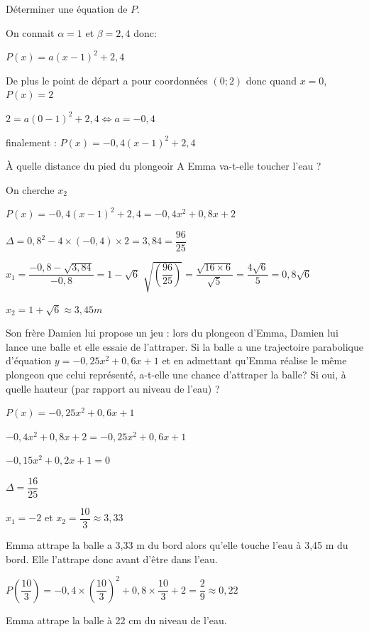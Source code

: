 \documentclass[11pt,a4paper]{article}  %
\begin{document}
\begin{enumMet}
	\item Déterminer une équation de $P$.
	\begin{corrBox}
		On connait $\alpha=1$ et $\beta=2,4$ donc:
		
		$P(x)=a(x-1)^2+2,4$
		
		De plus le point de départ a pour coordonnées $(0;2)$ donc quand $x=0$, $P(x)=2$
		
		$2=a(0-1)^2+2,4 \iff a=-0,4$
		
		finalement : $P(x)=-0,4(x-1)^2+2,4$	
	\end{corrBox}
	\item À quelle distance du pied du plongeoir A Emma va-t-elle toucher l'eau ?
	\begin{corrBox}
		On cherche $x_2$
		
		$P(x)=-0,4(x-1)^2+2,4=-0,4x^2+0,8x+2$
		
		$\Delta=0,8^2-4\times (-0,4)\times 2=3,84=\dfrac{96}{25}$
		
		$x_1=\dfrac{-0,8-\sqrt{3,84}}{-0,8}=1-\sqrt{6}$ \quad \quad \quad \quad \quad$\sqrt{\left(\dfrac{96}{25}\right)}=\dfrac{\sqrt{16\times 6}}{\sqrt{5}}=\dfrac{4\sqrt{6}}{5}=0,8\sqrt{6}$	
		
		$x_2=1+\sqrt{6}\approx3,45m$
	\end{corrBox}
	\item Son frère Damien lui propose un jeu : lors du plongeon d'Emma, Damien lui lance une balle et elle essaie de l'attraper. Si la balle a une trajectoire parabolique d'équation $y=-0,25 x^2+0,6 x+1$ et en admettant qu'Emma réalise le même plongeon que celui représenté, a-t-elle une chance d'attraper la balle? Si oui, à quelle hauteur (par rapport au niveau de l'eau) ?
	\begin{corrBox}
		$P(x)=-0,25 x^2+0,6 x+1$
		
		$-0,4 x^2+0,8 x+2=-0,25 x^2+0,6 x+1$
		
		$-0,15 x^2+0,2 x+1=0$
		
		$\Delta=\dfrac{16}{25}$
		
		$x_1=-2$ et $x_2=\dfrac{10}{3} \approx 3,33$
		
		Emma attrape la balle a 3,33 m du bord alors qu'elle touche l'eau à 3,45 m du bord. Elle l'attrape donc avant d'être dans l'eau.
		
		$P\left(\dfrac{10}{3}\right)=-0,4 \times\left(\dfrac{10}{3}\right)^2+0,8 \times \dfrac{10}{3}+2=\dfrac{2}{9} \approx 0,22$
		
		Emma attrape la balle à 22 cm du niveau de l'eau.
	\end{corrBox}
\end{enumMet}
\end{document}

